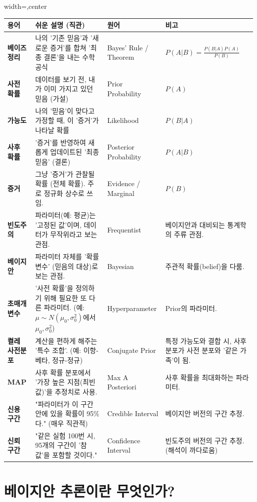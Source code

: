 \documentclass[11pt,a4paper]{book}
\theoremstyle{definition}
\begin{document}
\begin{adjustbox}{width=\textwidth,center}
\begin{tabular}{lp{6cm}p{4cm}l}
\toprule
\textbf{용어} & \textbf{쉬운 설명 (직관)} & \textbf{원어} & \textbf{비고} \\
\midrule
\textbf{베이즈 정리} & 나의 '기존 믿음'과 '새로운 증거'를 합쳐 '최종 결론'을 내는 수학 공식 & Bayes' Rule / Theorem & $P(A|B) = \frac{P(B|A)P(A)}{P(B)}$ \\
\textbf{사전 확률} & 데이터를 보기 전, 내가 이미 가지고 있던 믿음 (가설) & Prior Probability & $P(A)$ \\
\textbf{가능도} & 나의 '믿음'이 맞다고 가정할 때, 이 '증거'가 나타날 확률 & Likelihood & $P(B|A)$ \\
\textbf{사후 확률} & '증거'를 반영하여 새롭게 업데이트된 '최종 믿음' (결론) & Posterior Probability & $P(A|B)$ \\
\textbf{증거} & 그냥 '증거'가 관찰될 확률 (전체 확률). 주로 정규화 상수로 쓰임. & Evidence / Marginal & $P(B)$ \\
\textbf{빈도주의} & 파라미터(예: 평균)는 '고정된 값'이며, 데이터가 무작위라고 보는 관점. & Frequentist & 베이지안과 대비되는 통계학의 주류 관점. \\
\textbf{베이지안} & 파라미터 자체를 '확률 변수' (믿음의 대상)로 보는 관점. & Bayesian & 주관적 확률(belief)을 다룸. \\
\textbf{초매개변수} & '사전 확률'을 정의하기 위해 필요한 또 다른 파라미터. (예: $\mu \sim N(\mu_0, \sigma_0^2)$에서 $\mu_0, \sigma_0^2$) & Hyperparameter & Prior의 파라미터. \\
\textbf{켤레 사전분포} & 계산을 편하게 해주는 '특수 조합'. (예: 이항-베타, 정규-정규) & Conjugate Prior & 특정 가능도와 결합 시, 사후 분포가 사전 분포와 '같은 가족'이 됨. \\
\textbf{MAP} & 사후 확률 분포에서 '가장 높은 지점(최빈값)'을 추정치로 사용. & Max A Posteriori & 사후 확률을 최대화하는 파라미터. \\
\textbf{신용 구간} & "파라미터가 이 구간 안에 있을 확률이 95\%다." (매우 직관적) & Credible Interval & 베이지안 버전의 구간 추정. \\
\textbf{신뢰 구간} & "같은 실험 100번 시, 95개의 구간이 '참 값'을 포함할 것이다." & Confidence Interval & 빈도주의 버전의 구간 추정. (해석이 까다로움) \\
\bottomrule
\end{tabular}
\end{adjustbox}


\section{베이지안 추론이란 무엇인가?}
\end{document}
